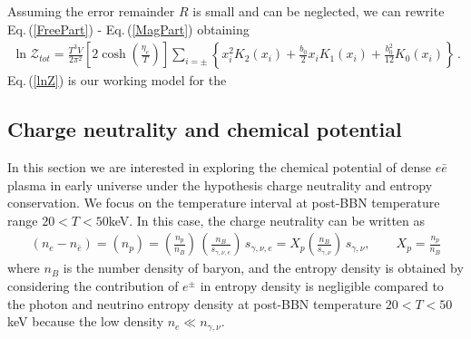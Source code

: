 \documentclass[Universe,article,submit,moreauthors,pdftex]{Definitions/mdpi}
\newcommand{\req}[1]{Eq.\,(\ref{#1})}
\begin{document}
Assuming the error remainder $R$ is small and can be neglected, we can rewrite \req{FreePart} - \req{MagPart} obtaining
\begin{align}
  \label{lnZ}
  \ln\mathcal{Z}_{tot}=\frac{T^3V}{2\pi^2}\left[2\cosh\left(\frac{\eta_{e}}{T}\right)\right]\sum_{i=\pm}\left\{x_i^{2} K_2\left(x_i\right)+\frac{b_0}{2}x_iK_1\left(x_i\right)+\frac{b^2_0}{12}K_0\left(x_i\right)\right\}\,.
\end{align}
\req{lnZ} is our working model for the

\subsection{Charge neutrality and chemical potential}
 In this section we are interested in exploring the chemical potential of dense $e\bar e$ plasma in early universe under the hypothesis charge neutrality and entropy conservation. We focus on the temperature interval at post-BBN temperature range $20<T<50$keV. In this case, the charge neutrality can be written as
\begin{align}
  \label{density_proton}
  \left(n_{e}-n_{\bar{e}}\right)=(n_{p})=\left(\frac{n_{p}}{n_{B}}\right)\,\left(\frac{n_{B}}{s_{\gamma,\nu,e}}\right)\,s_{\gamma,\nu,e}= X_p\left(\frac{n_B}{s_{\gamma,\nu}}\right)\,s_{\gamma,\nu},\qquad X_p=\frac{n_p}{n_B}
\end{align}
where $n_B$ is the number density of baryon, and the entropy density is obtained by considering the contribution of $e^\pm$ in entropy density is negligible compared to the photon and neutrino entropy density at post-BBN temperature $20<T<50$keV because the low density $n_e\ll n_{\gamma,\nu}$. 
\end{document}
